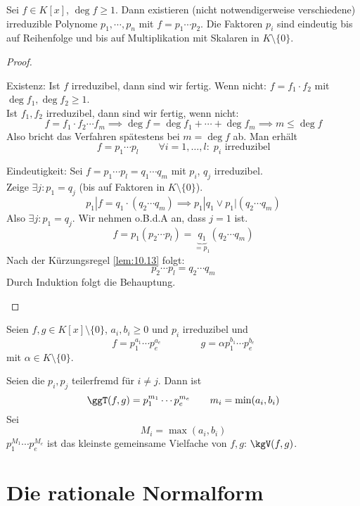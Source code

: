 \documentclass[a4paper, 10pt]{scrbook}
\begin{document}
\begin{thm}
\label{thm:12.5}
Sei $f\in K[x]$, $\deg f\ge 1$.
Dann existieren (nicht notwendigerweise verschiedene) irreduzible Polynome $p_1,\cdots,p_n$ mit
$f=p_1\cdots p_2$.
Die Faktoren $p_i$ sind eindeutig bis auf Reihenfolge und bis auf Multiplikation mit Skalaren in $K\setminus \{0\}$.

\begin{proof}
	\begin{seg}{Existenz:}
Ist $f$ irreduzibel, dann sind wir fertig.
Wenn nicht: $f=f_1\cdot f_2$ mit $\deg f_1,\deg f_2 \ge 1$.\\
Ist $f_1, f_2$ irreduzibel, dann sind wir fertig, wenn nicht:\\
\[
f=f_1\cdot f_2\cdots f_m \implies \deg f=\deg f_1 + \dotsb + \deg f_m \implies m\le \deg f
\]
Also bricht das Verfahren spätestens bei $m=\deg f$ ab.
Man erhält
\[
	f=p_1\dotsb p_l \qquad \forall i=1,\dotsc,l :\; p_i \text{ irreduzibel}
\]
\end{seg}

\begin{seg}{Eindeutigkeit:}
Sei $f=p_1\dotsb p_l=q_1\dotsb q_m$ mit $p_i$, $q_j$ irreduzibel.
\\Zeige $\exists j:p_1=q_j$ (bis auf Faktoren in $K \setminus \{0\}$).
\[
p_1|f = q_1\cdot (q_2\dotsb q_m) \implies p_1|q_1 \lor p_1|(q_2\dotsb q_m)
\]
Also $\exists j:p_1=q_j$.
Wir nehmen o.B.d.A an, dass $j=1$ ist.
\[
f=p_1(p_2\dotsb p_l) = \underbrace{q_1}_{=p_1}(q_2\dotsb q_m)
\]
Nach der Kürzungsregel \ref{lem:10.13} folgt:
\[
p_2\dotsb p_l = q_2 \dotsb q_m
\]
Durch Induktion folgt die Behauptung.
\end{seg}
\end{proof}
\end{thm}

Seien $f,g\in K[x]\setminus \{0\}$, $a_i,b_i\ge 0$ und $p_i$ irreduzibel und
\[
	f=p_1^{a_1} \dotsb p_e^{a_e} \qquad\qquad g=\alpha p_1^{b_1}\dotsb p_e^{b_e}
\]
mit $\alpha \in K\setminus \{0\}$.

Seien die $p_i,p_j$ teilerfremd für $i\neq j$.
Dann ist
\[
\ggT(f,g) = p_1^{m_1}\dotsb p_e^{m_e} \qquad {m_i=\min(a_i,b_i)}
\]
Sei
\[
M_i =\max(a_i,b_i)
\]
$p_1^{M_1}\dotsb p_e^{M_e}$ ist das kleinste gemeinsame Vielfache von $f,g$: $\kgV(f,g)$.


\section{Die rationale Normalform}
\end{document}
